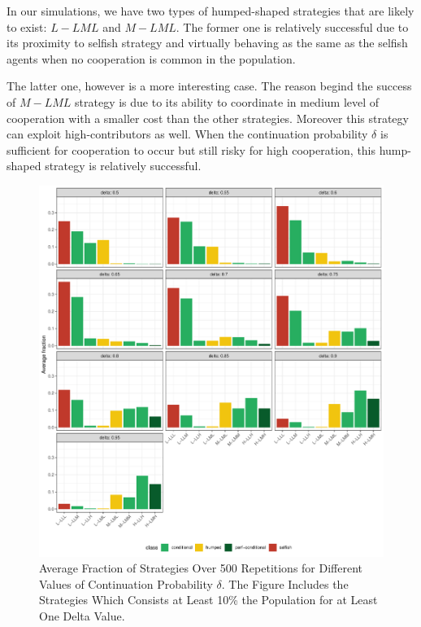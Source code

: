\documentclass[12pt]{article}
\begin{document}
In our simulations, we have two types of humped-shaped strategies that are likely to exist: $L-LML$ and $M-LML$. The former one is relatively successful due to its proximity to selfish strategy and virtually behaving as the same as the selfish agents when no cooperation is common in the population. 

The latter one, however is a more interesting case. The reason begind the success of $M-LML$ strategy is due to its ability to coordinate in medium level of cooperation with a smaller cost than the other strategies. Moreover this strategy can exploit high-contributors as well. When the continuation probability $\delta$ is sufficient for cooperation to occur but still risky for high cooperation, this hump-shaped strategy is relatively successful.


\begin{figure}[H]
	\centering

	\includegraphics[width=1\linewidth]{img/types_average}

	\caption[Average Fraction of Strategies]{Average Fraction of Strategies Over 500 Repetitions for Different Values of Continuation Probability $\delta$. The Figure Includes the Strategies Which Consists at Least 10\% the Population for at Least One Delta Value.}
	\label{fig:evo-typesdelta}
\end{figure}
\end{document}
